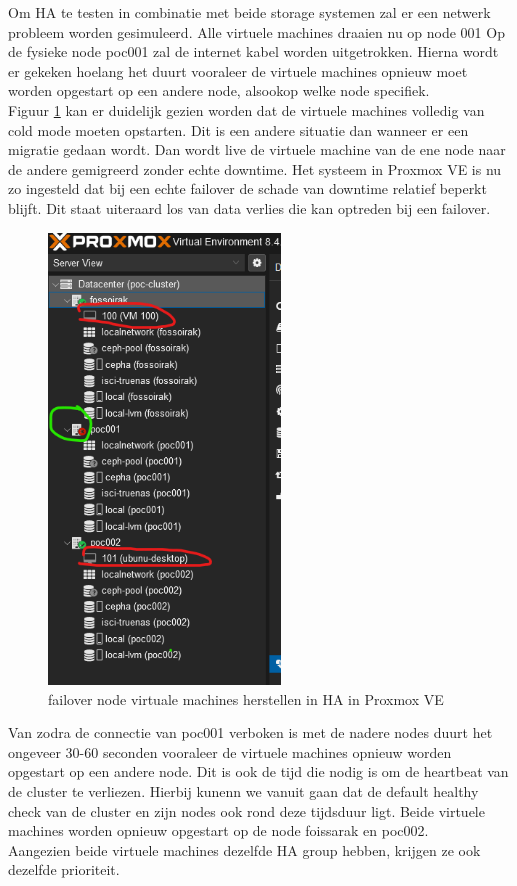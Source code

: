 Om HA te testen in combinatie met beide storage systemen zal er een netwerk probleem worden gesimuleerd.
Alle virtuele machines draaien nu op node 001
Op de fysieke node poc001 zal de internet kabel worden uitgetrokken. Hierna wordt er gekeken hoelang het duurt vooraleer de virtuele machines opnieuw moet worden opgestart op een andere node, alsookop welke node specifiek. \\

Figuur \ref{fig:failover-vm} kan er duidelijk gezien worden dat de virtuele machines volledig van cold mode moeten opstarten. Dit is een andere situatie dan wanneer er een migratie gedaan wordt.
Dan wordt live de virtuele machine van de ene node naar de andere gemigreerd zonder echte downtime.
Het systeem in Proxmox VE is nu zo ingesteld dat bij een echte failover de schade van downtime relatief beperkt blijft. Dit staat uiteraard los van data verlies die kan optreden bij een failover.
\begin{figure}[H]
  \centering
  \includegraphics[width=0.55\textwidth]{../poc/failover-prox.png}
  \caption{failover node virtuale machines herstellen in HA in Proxmox VE}
  \label{fig:failover-vm}
\end{figure}

Van zodra de connectie van poc001 verboken is met de nadere nodes duurt het ongeveer 30-60 seconden vooraleer de virtuele machines opnieuw worden opgestart op een andere node. Dit is ook de tijd die nodig is om de heartbeat van de cluster te verliezen.
Hierbij kunenn we vanuit gaan dat de default healthy check van de cluster en zijn nodes ook rond deze tijdsduur ligt. Beide virtuele machines worden opnieuw opgestart op de node foissarak en poc002. \\
Aangezien beide virtuele machines dezelfde HA group hebben, krijgen ze ook dezelfde prioriteit.

